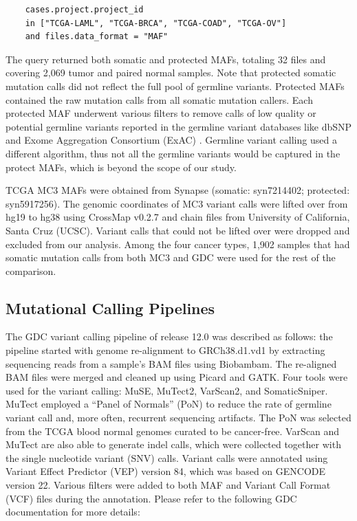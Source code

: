 \par\noindent\begin{verbatim}
    cases.project.project_id
    in ["TCGA-LAML", "TCGA-BRCA", "TCGA-COAD", "TCGA-OV"]
    and files.data_format = "MAF"
\end{verbatim}

The query returned both somatic and protected MAFs, totaling 32 files and covering 2,069 tumor and paired normal samples. Note that protected somatic mutation calls did not reflect the full pool of germline variants. Protected MAFs contained the raw mutation calls from all somatic mutation callers. Each protected MAF underwent various filters to remove calls of low quality or potential germline variants reported in the germline variant databases like dbSNP \cite{sherryst_sirotkink:dbSNP2001} and Exome Aggregation Consortium (ExAC) \cite{lekm_exomeaggregationconsortium:AnalysisProteincoding2016}. Germline variant calling used a different algorithm, thus not all the germline variants would be captured in the protect MAFs, which is beyond the scope of our study.

TCGA MC3 MAFs were obtained from Synapse (somatic: syn7214402; protected: syn5917256). The genomic coordinates of MC3 variant calls were lifted over from hg19 to hg38 using CrossMap v0.2.7 and chain files from University of California, Santa Cruz (UCSC). Variant calls that could not be lifted over were dropped and excluded from our analysis. Among the four cancer types, 1,902 samples that had somatic mutation calls from both MC3 and GDC were used for the rest of the comparison.

\subsection{Mutational Calling Pipelines}
The GDC variant calling pipeline of release 12.0 was described as follows: the pipeline started with genome re-alignment to GRCh38.d1.vd1 by extracting sequencing reads from a sample's BAM files using Biobambam. The re-aligned BAM files were merged and cleaned up using Picard and GATK. Four tools were used for the variant calling: MuSE, MuTect2, VarScan2, and SomaticSniper. MuTect employed a ``Panel of Normals'' (PoN) to reduce the rate of germline variant call and, more often, recurrent sequencing artifacts. The PoN was selected from the TCGA blood normal genomes curated to be cancer-free. VarScan and MuTect are also able to generate indel calls, which were collected together with the single nucleotide variant (SNV) calls. Variant calls were annotated using Variant Effect Predictor (VEP) version 84, which was based on GENCODE version 22. Various filters were added to both MAF and Variant Call Format (VCF) files during the annotation. Please refer to the following GDC documentation for more details:

